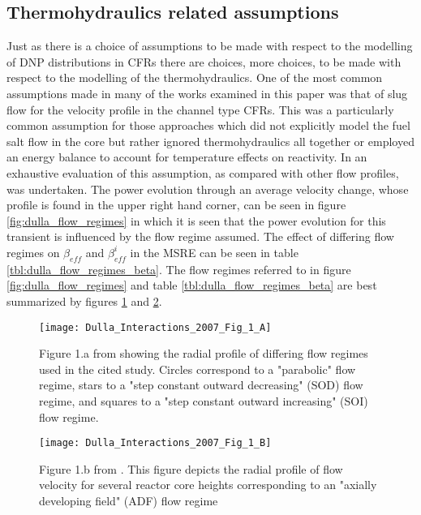 \documentclass[review]{elsarticle}
\begin{document}
\subsection{Thermohydraulics related assumptions} \label{th_asm}
Just as there is a choice of assumptions to be made with respect to the
modelling of DNP distributions in CFRs there are choices, more choices, to be
made with respect to the modelling of the thermohydraulics. One of the most
common assumptions made in many of the works examined in this paper was that
of slug flow for the velocity profile in the channel type CFRs. This was a
particularly common assumption for those approaches which did not explicitly
model the fuel salt flow in the core but rather ignored thermohydraulics
all together or employed an energy balance to account for temperature effects
on reactivity. In \cite{dulla_interactions_2007} an exhaustive evaluation
of this assumption, as compared with other flow profiles, was undertaken.
The power evolution through an average velocity change, whose profile is found
in the upper right hand corner, can be seen in figure 
\ref{fig:dulla_flow_regimes}
in which it is seen that the power evolution for this transient is 
influenced by the flow regime assumed. The effect of differing flow regimes
on $\beta_{eff}$ and $\beta_{eff}^{i}$ in the MSRE can be seen in table
\ref{tbl:dulla_flow_regimes_beta}. The flow regimes referred to in figure
\ref{fig:dulla_flow_regimes} and table \ref{tbl:dulla_flow_regimes_beta} are
best 
summarized by figures \ref{fig:dulla_flow_map} and \ref{fig:dulla_flow_adf}.

\begin{figure}[h]
   \centering
   \texttt{[image: Dulla\_Interactions\_2007\_Fig\_1\_A]}
   \caption{Figure 1.a from \cite{dulla_interactions_2007} showing the radial profile of
   differing flow regimes used in the cited study. Circles correspond
    to a "parabolic" flow regime, stars to a "step constant outward decreasing"
    (SOD) flow regime, and squares to a "step constant outward increasing" (SOI)
    flow regime.} 
   \label{fig:dulla_flow_map}
\end{figure}

\begin{figure}[h]
   \centering
   \texttt{[image: Dulla\_Interactions\_2007\_Fig\_1\_B]}
   \caption{Figure 1.b from \cite{dulla_interactions_2007}.
   This figure depicts
   the radial profile of flow velocity for several reactor core heights
   corresponding to an "axially developing field" (ADF) flow regime} 
   \label{fig:dulla_flow_adf}
\end{figure}
\end{document}

